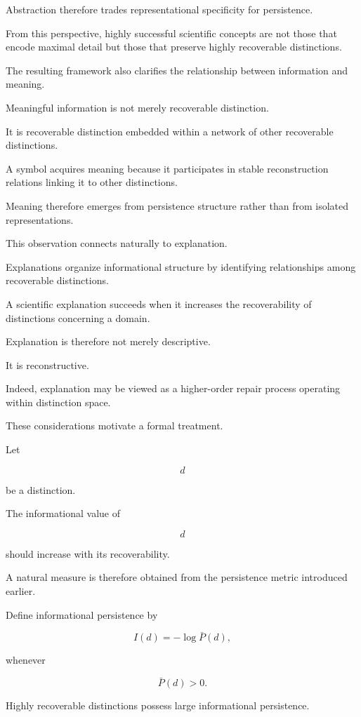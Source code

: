 \documentclass[12pt,oneside]{article}
\theoremstyle{definition}
\begin{document}
Abstraction therefore trades representational specificity for persistence.

From this perspective, highly successful scientific concepts are not those that encode maximal detail but those that preserve highly recoverable distinctions.

The resulting framework also clarifies the relationship between information and meaning.

Meaningful information is not merely recoverable distinction.

It is recoverable distinction embedded within a network of other recoverable distinctions.

A symbol acquires meaning because it participates in stable reconstruction relations linking it to other distinctions.

Meaning therefore emerges from persistence structure rather than from isolated representations.

This observation connects naturally to explanation.

Explanations organize informational structure by identifying relationships among recoverable distinctions.

A scientific explanation succeeds when it increases the recoverability of distinctions concerning a domain.

Explanation is therefore not merely descriptive.

It is reconstructive.

Indeed, explanation may be viewed as a higher-order repair process operating within distinction space.

These considerations motivate a formal treatment.

Let

\[
d
\]

be a distinction.

The informational value of

\[
d
\]

should increase with its recoverability.

A natural measure is therefore obtained from the persistence metric introduced earlier.

Define informational persistence by

\[
I(d)
=
-\log \bar P(d),
\]

whenever

\[
\bar P(d)>0.
\]

Highly recoverable distinctions possess large informational persistence.
\end{document}
